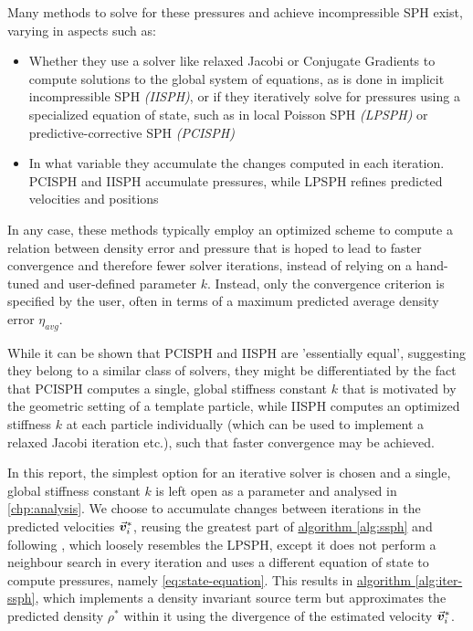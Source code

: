Many methods to solve for these pressures and achieve incompressible SPH exist, varying in aspects such as:

\begin{itemize}
  \item Whether they use a solver like relaxed Jacobi or Conjugate Gradients to compute solutions to the global system of equations, as is done in implicit incompressible SPH \textit{(IISPH)}\autocite*{2014-sph-sruvey-eurographics}\autocite*{iisph}, or if they iteratively solve for pressures using a specialized equation of state, such as in local Poisson SPH \textit{(LPSPH)}\autocite*{lpsph} or predictive-corrective SPH \textit{(PCISPH)}\autocite*{pcisph}
  \item In what variable they accumulate the changes computed in each iteration. PCISPH\autocite*{pcisph} and IISPH\autocite*{iisph} accumulate pressures, while LPSPH refines predicted velocities and positions\autocite*{lpsph}
\end{itemize}

In any case, these methods typically employ an optimized scheme to compute a relation between density error and pressure that is hoped to lead to faster convergence and therefore fewer solver iterations, instead of relying on a hand-tuned and user-defined parameter $k$. Instead, only the convergence criterion is specified by the user, often in terms of a maximum predicted average density error $\eta_{avg}$\autocite*{pcisph}\autocite*{lpsph}\autocite*{iisph}.

While it can be shown that PCISPH and IISPH are 'essentially equal'\autocite*{tutorial}, suggesting they belong to a similar class of solvers, they might be differentiated by the fact that PCISPH computes a single, global stiffness constant $k$ that is motivated by the geometric setting of a template particle, while IISPH computes an optimized stiffness $k$ at each particle individually (which can be used to implement a relaxed Jacobi iteration etc.), such that faster convergence may be achieved\autocite*{tutorial}.


In this report, the simplest option for an iterative solver is chosen and a single, global stiffness constant $k$ is left open as a parameter and analysed in \autoref{chp:analysis}. We choose to accumulate changes between iterations in the predicted velocities $\vec{\bm{v}}_i^*$, reusing the greatest part of \hyperref[alg:ssph]{algorithm \ref{alg:ssph}} and following \cite[this description]{teschner-lecture}, which loosely resembles the LPSPH\autocite*{lpsph}, except it does not perform a neighbour search in every iteration and uses a different equation of state to compute pressures, namely \autoref{eq:state-equation}. This results in \hyperref[alg:iter-ssph]{algorithm \ref{alg:iter-ssph}}, which implements a density invariant source term but approximates the predicted density $\rho^*$ within it using the divergence of the estimated velocity $\vec{\bm{v}}_i^*$.



